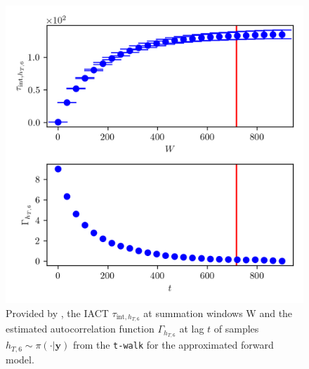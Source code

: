 \begin{figure}[ht!]
	\centering
	\includegraphics{UwerrTauIntTWalk16.png}
	\caption[IACT and autocorrelation function of samples $h_{T,6} \sim \pi(\cdot|\bm{y})$, for approximated model.]{Provided by \cite{drikHesse}, the IACT $\tau_{\text{int},h_{T,6}}$ at summation windows W and the estimated autocorrelation function $\Gamma_{h_{T,6}}$ at lag $t$ of samples $h_{T,6} \sim \pi( \cdot| \bm{y})$ from the \texttt{t-walk} for the approximated forward model.}
	\label{fig:TWalkIATC17}
\end{figure}

